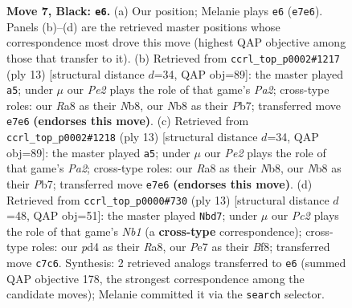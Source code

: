 \documentclass[11pt]{article}
\begin{document}
\begin{figure}[p]
\caption{\textbf{Move 7, Black: \texttt{e6}.} (a) Our position; Melanie plays \texttt{e6} (\texttt{e7e6}). Panels (b)--(d) are the retrieved master positions whose correspondence most drove this move (highest QAP objective among those that transfer to it). (b) Retrieved from \texttt{ccrl\_top\_p0002\#1217} (ply 13) [structural distance $d$=34, QAP obj=89]: the master played \texttt{a5}; under $\mu$ our \emph{Pe2} plays the role of that game's \emph{Pa2}; cross-type roles: our \emph{R}a8 as their \emph{N}b8, our \emph{N}b8 as their \emph{P}b7; transferred move \texttt{e7e6} \textbf{(endorses this move)}. (c) Retrieved from \texttt{ccrl\_top\_p0002\#1218} (ply 13) [structural distance $d$=34, QAP obj=89]: the master played \texttt{a5}; under $\mu$ our \emph{Pe2} plays the role of that game's \emph{Pa2}; cross-type roles: our \emph{R}a8 as their \emph{N}b8, our \emph{N}b8 as their \emph{P}b7; transferred move \texttt{e7e6} \textbf{(endorses this move)}. (d) Retrieved from \texttt{ccrl\_top\_p0000\#730} (ply 13) [structural distance $d$=48, QAP obj=51]: the master played \texttt{Nbd7}; under $\mu$ our \emph{Pc2} plays the role of that game's \emph{Nb1} (a \textbf{cross-type} correspondence); cross-type roles: our \emph{p}d4 as their \emph{R}a8, our \emph{P}e7 as their \emph{B}f8; transferred move \texttt{c7c6}. Synthesis: 2 retrieved analogs transferred to \texttt{e6} (summed QAP objective 178, the strongest correspondence among the candidate moves); Melanie committed it via the \texttt{search} selector.}
\label{fig:thought-m13}
\end{figure}

\clearpage
\end{document}
